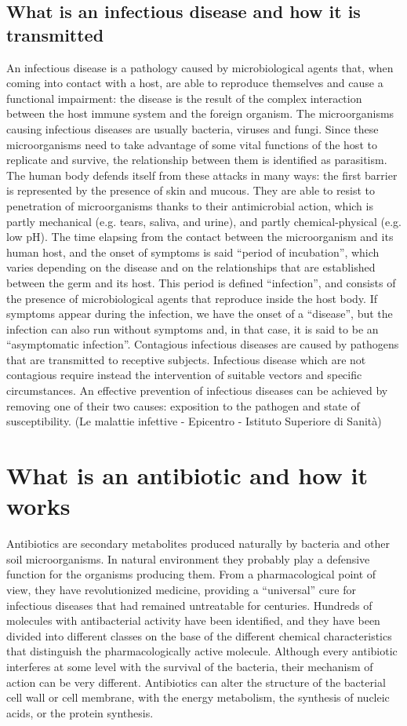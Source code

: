 \documentclass[11pt]{report}
\begin{document}
\section{What is an infectious disease and how it is transmitted}

An infectious disease is a pathology caused by microbiological agents that, when coming into contact with a host, are able to reproduce themselves and cause a functional impairment: the disease is the result of the complex interaction between the host immune system and the foreign organism. The microorganisms causing infectious diseases are usually bacteria, viruses and fungi. Since these microorganisms need to take advantage of some vital functions of the host to replicate and survive, the relationship between them is identified as parasitism.
The human body defends itself from these attacks in many ways: the first barrier is represented by the presence of skin and mucous. They are able to resist to penetration of microorganisms thanks to their antimicrobial action, which is partly mechanical (e.g. tears, saliva, and urine), and partly chemical-physical (e.g. low pH). The time elapsing from the contact between the microorganism and its human host, and the onset of symptoms is said “period of incubation”, which varies depending on the disease and on the relationships that are established between the germ and its host. This period is defined “infection”, and consists of the presence of microbiological agents that reproduce inside the host body.
If symptoms appear during the infection, we have the onset of a “disease”, but the infection can also run without symptoms and, in that case, it is said to be an “asymptomatic infection”.
Contagious infectious diseases are caused by pathogens that are transmitted to receptive subjects. Infectious disease which are not contagious require instead the intervention of suitable vectors and specific circumstances. An effective prevention of infectious diseases can be achieved by removing one of their two causes: exposition to the pathogen and state of susceptibility.
(Le malattie infettive - Epicentro - Istituto Superiore di Sanità)

\chapter{What is an antibiotic and how it works}
Antibiotics are secondary metabolites produced naturally by bacteria and other soil microorganisms. In natural environment they probably play a defensive function for the organisms producing them. From a pharmacological point of view, they have revolutionized medicine, providing a “universal” cure for infectious diseases that had remained untreatable for centuries. Hundreds of molecules with antibacterial activity have been identified, and they have been divided into different classes on the base of the different chemical characteristics that distinguish the pharmacologically active molecule. Although every antibiotic interferes at some level with the survival of the bacteria, their mechanism of action can be very different. Antibiotics can alter the structure of the bacterial cell wall or cell membrane, with the energy metabolism, the synthesis of nucleic acids, or the protein synthesis.
\end{document}
